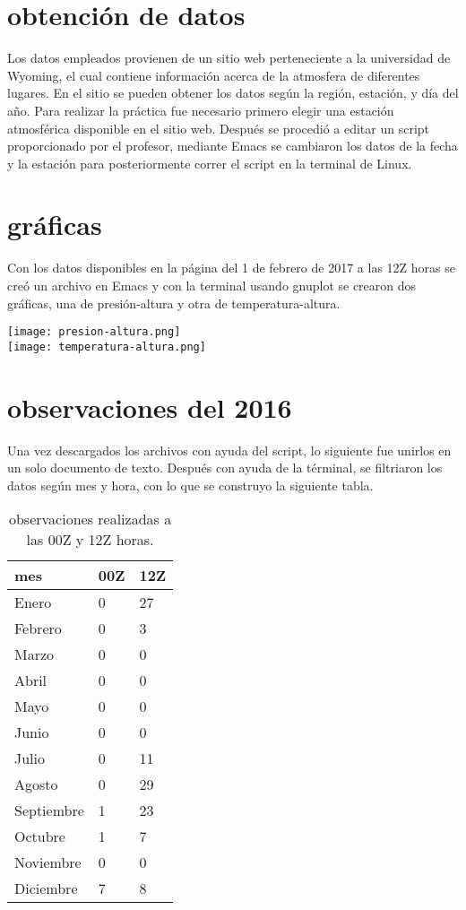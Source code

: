 \documentclass[11pt]{article}
\begin{document}
\section*{obtención de datos}
Los datos empleados provienen de un sitio web perteneciente a la universidad de Wyoming, el cual contiene información acerca de la atmosfera de diferentes lugares. En el sitio se pueden obtener los datos según la región, estación, y día del año.
Para realizar la práctica fue necesario primero elegir una estación atmosférica disponible en el sitio web. Después se procedió a editar un script proporcionado por el profesor, mediante Emacs  se cambiaron los datos de la fecha y la estación para posteriormente correr el script en la terminal de Linux.
\section*{gráficas}
Con los datos disponibles en la página del 1 de febrero de 2017 a las 12Z horas se creó un archivo en Emacs y con la terminal usando gnuplot se crearon dos gráficas, una de presión-altura y otra de temperatura-altura.
\begin{center}
\texttt{[image: presion-altura.png]}\\[.5cm] 
\texttt{[image: temperatura-altura.png]}\\[.5cm] 
\end{center}

\section*{observaciones del 2016}
Una vez descargados los archivos con ayuda del script, lo siguiente fue unirlos en un solo documento de texto. Después con ayuda de la términal, se filtriaron los datos según mes y hora, con lo que se construyo la siguiente tabla.
\begin{table}[htbp]
\begin{center}
\begin{tabular}{|l|l|l|}
\hline \hline
mes & 00Z & 12Z  \\
\hline \hline
Enero & 0 & 27 \\ \hline
Febrero & 0 & 3\\ \hline
Marzo & 0 & 0\\ \hline
Abril & 0 & 0 \\ \hline
Mayo & 0 & 0 \\ \hline
Junio & 0 & 0 \\ \hline
Julio & 0 & 11 \\ \hline
Agosto & 0 & 29 \\ \hline
Septiembre & 1 & 23 \\ \hline
Octubre & 1 & 7 \\ \hline
Noviembre & 0 & 0 \\ \hline
Diciembre & 7 & 8 \\ \hline
\end{tabular}
\caption{observaciones realizadas a las 00Z y 12Z horas.}
\label{tabla:sencilla}
\end{center}
\end{table}
\end{document}
